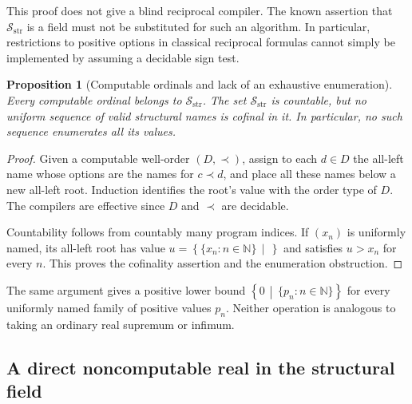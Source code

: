 \documentclass[11pt,letterpaper]{article}
\numberwithin{equation}{section}
\newtheorem{proposition}[theorem]{Proposition}
\theoremstyle{definition}
\theoremstyle{remark}
\newcommand{\Sc}{\mathcal S_{\mathrm{str}}}
\newcommand{\N}{\mathbb N}
\newcommand{\cut}[2]{\left\{#1\,\middle|\,#2\right\}}
\begin{document}
This proof does not give a blind reciprocal compiler. The known assertion
that $\Sc$ is a field must not be substituted for such an algorithm. In
particular, restrictions to positive options in classical reciprocal
formulas cannot simply be implemented by assuming a decidable sign test.

\begin{proposition}[Computable ordinals and lack of an exhaustive enumeration]
\label{prop:structcount}
Every computable ordinal belongs to $\Sc$. The set $\Sc$ is countable,
but no uniform sequence of valid structural names is cofinal in it. In
particular, no such sequence enumerates all its values.
\end{proposition}
\begin{proof}
Given a computable well-order $(D,\prec)$, assign to each $d\in D$ the
all-left name whose options are the names for $c\prec d$, and place all
these names below a new all-left root. Induction identifies the root's value
with the order type of $D$. The compilers are effective since $D$ and
$\prec$ are decidable.

Countability follows from countably many program indices. If $(x_n)$ is
uniformly named, its all-left root has value $u=\cut{\{x_n:n\in\N\}}{}$
and satisfies $u>x_n$ for every $n$. This proves the cofinality assertion
and the enumeration obstruction.
\end{proof}

The same argument gives a positive lower bound $\cut0{\{p_n:n\in\N\}}$
for every uniformly named family of positive values $p_n$. Neither operation
is analogous to taking an ordinary real supremum or infimum.

\subsection{A direct noncomputable real in the structural field}
\end{document}
